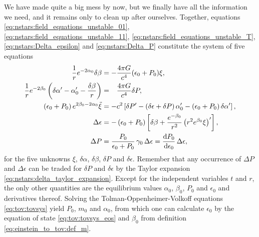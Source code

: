 We have made quite a big mess by now, but we finally have all the information we need, and it remains only to clean up after ourselves.
Together, equations \eqref{eq:nstars:field_equations_unstable_01}, \eqref{eq:nstars:field_equations_unstable_11}, \eqref{eq:nstars:field_equations_unstable_T}, \eqref{eq:nstars:Delta_epsilon} and \eqref{eq:nstars:Delta_P} constitute the system of five equations
\begin{subequations}
\begin{align}
	\frac{1}{r} e^{-2\alpha_0} \delta\beta                                                      &= -           \frac{4 \pi G}{c^4} (\epsilon_0 + P_0) \xi , \label{eq:nstars:perturbation_system_01} \\
	\frac{1}{r} e^{-2\beta_0} \left( \delta\alpha' - \alpha_0' - \frac{\delta \beta}{r} \right) &= \phantom{-} \frac{4 \pi G}{c^4} \delta P               , \label{eq:nstars:perturbation_system_11} \\
	\left( \epsilon_0 + P_0 \right) e^{2 \beta_0 - 2 \alpha_0} \ddot \xi                                                        &= -c^2 \left[ \delta P' - \left( \delta \epsilon + \delta P \right) \alpha_0' - \left( \epsilon_0 + P_0 \right) \delta \alpha' \right] , \label{eq:nstars:perturbation_system_euler} \\
	\Delta \epsilon                                                                                                             &= - \left( \epsilon_0 + P_0 \right) \left[ \delta\beta + \frac{e^{-\beta_0}}{r^2} \left( r^2 e^{\beta_0} \xi \right)' \right]  , \label{eq:nstars:perturbation_system_energy_conservation} \\
	\Delta P &= \frac{P_0}{\epsilon_0 + P_0} \, \gamma_0 \, \Delta \epsilon = \odv{P_0}{\epsilon_0} \, \Delta\epsilon, \label{eq:nstars:perturbation_system_adiabadicity}
\end{align}%
\label{eq:nstars:perturbation_system}%
\end{subequations}%
for the five unknowns $\xi$, $\delta \alpha$, $\delta \beta$, $\delta P$ and $\delta \epsilon$.
Remember that any occurrence of $\Delta P$ and $\Delta \epsilon$ can be traded for $\delta P$ and $\delta \epsilon$ by the Taylor expansion \eqref{eq:nstars:delta_taylor_expansion}.
Except for the independent variables $t$ and $r$, the only other quantities are the equilibrium values $\alpha_0$, $\beta_0$, $P_0$ and $\epsilon_0$ and derivatives thereof.
Solving the Tolman-Oppenheimer-Volkoff equations \eqref{eq:tov:tovsys} yield $P_0$, $m_0$ and $\alpha_0$, from which one can calculate $\epsilon_0$ by the equation of state \eqref{eq:tov:tovsys_eos} and $\beta_0$ from definition \eqref{eq:einstein_to_tov:def_m}.

